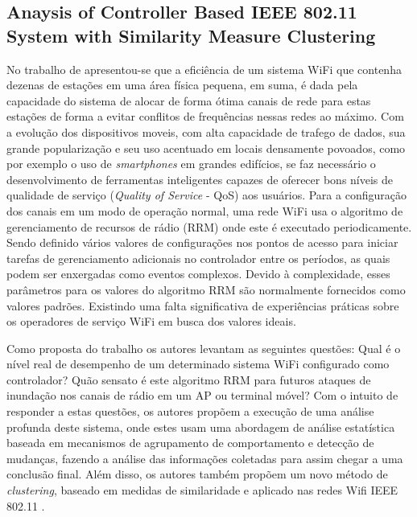 \documentclass[ti,table]{texufpel} %
\begin{document}
     

  

  

\subsection{Anaysis of Controller Based IEEE 802.11 System with Similarity Measure Clustering} 

  

  

    No trabalho de \cite{art7gal2017anaysis} apresentou-se que a eficiência de um sistema WiFi que contenha dezenas de estações em uma área física pequena, em suma, é dada pela capacidade do sistema de alocar de forma ótima canais de rede para estas estações de forma a evitar conflitos de frequências nessas redes ao máximo. Com a evolução dos dispositivos moveis, com alta capacidade de trafego de dados, sua grande popularização e seu uso acentuado em locais densamente povoados, como por exemplo o uso de \textit{smartphones} em grandes edifícios, se faz necessário o desenvolvimento de ferramentas inteligentes capazes de oferecer bons níveis de qualidade de serviço (\textit{Quality of Service} - QoS) aos usuários. Para a configuração dos canais em um modo de operação normal, uma rede WiFi usa o algoritmo de gerenciamento de recursos de rádio (RRM) onde este é executado periodicamente. Sendo definido vários valores de configurações nos pontos de acesso para iniciar tarefas de gerenciamento adicionais no controlador entre os períodos, as quais podem ser enxergadas como eventos complexos. Devido à complexidade, esses parâmetros para os valores do algoritmo RRM são normalmente fornecidos como valores padrões. Existindo uma falta significativa de experiências práticas sobre os operadores de serviço WiFi em busca dos valores ideais. 

     

     Como proposta do trabalho os autores levantam as seguintes questões: Qual é o nível real de desempenho de um determinado sistema WiFi configurado como controlador? Quão sensato é este algoritmo RRM para futuros ataques de inundação nos canais de rádio em um AP ou terminal móvel? Com o intuito de responder a estas questões, os autores propõem a execução de uma análise profunda deste sistema, onde estes usam uma abordagem de análise estatística baseada em mecanismos de agrupamento de comportamento e detecção de mudanças, fazendo a análise das informações coletadas para assim chegar a uma conclusão final. Além disso, os autores também propõem um novo método de \textit{clustering}, baseado em medidas de similaridade e aplicado nas redes Wifi IEEE 802.11 \cite{art7gal2017anaysis}.         
\end{document}
